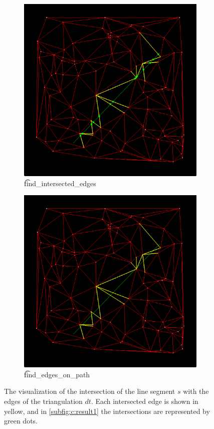 \begin{figure}
	\centering
	\begin{subfigure}[b]{0.495\textwidth}
		\centering
		\includegraphics[width=\textwidth]{./img/c_result1}
		\caption{\t{find_intersected_edges}}
		\label{subfig:c:result1}
	\end{subfigure}
	\begin{subfigure}[b]{0.495\textwidth}
		\centering
		\includegraphics[width=\textwidth]{./img/c_result2}
		\caption{\t{find_edges_on_path}}
		\label{subfig:c:result2}
	\end{subfigure}	
	\caption{The visualization of the intersection of the line segment $s$ with the edges of the triangulation $dt$. Each intersected edge is shown in yellow, and in \autoref{subfig:c:result1} the intersections are represented by green dots.}
	\label{fig:c:result}
\end{figure}

